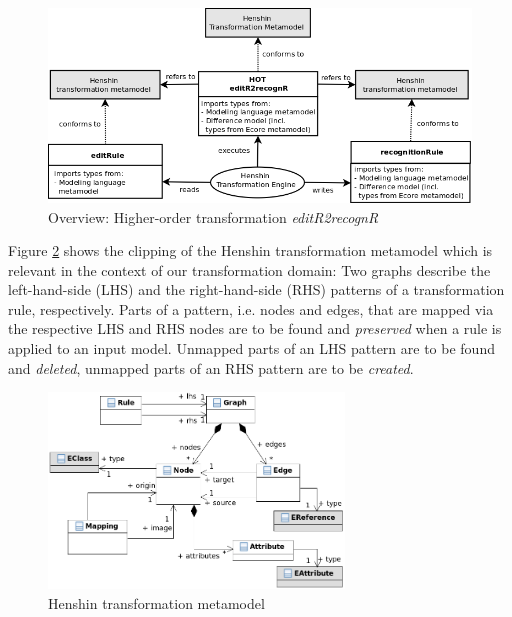 \documentclass{llncs}
\begin{document}
\begin{figure}[htb]
  \centering
  \includegraphics[width=1.0\textwidth]{pic/editR2recognitionR-overview-1.png}
  \caption{Overview: Higher-order transformation \textit{editR2recognR}}
  \label{fig:overview}
\end{figure}

Figure \ref{fig:henshin-metamodel} shows the clipping of the
Henshin transformation metamodel which is relevant in the context
of our transformation domain: 
Two graphs describe the left-hand-side (LHS)
and the right-hand-side (RHS) patterns of a transformation rule, 
respectively.
Parts of a pattern, i.e. nodes and edges, that are mapped via
the respective LHS and RHS nodes are to be found and \textit{preserved} when
a rule is applied to an input model.
Unmapped parts of an LHS pattern are to be found
and \textit{deleted}, unmapped parts of an RHS pattern 
are to be \textit{created}.

\begin{figure}[htb]
  \centering
  \includegraphics[width=0.7\textwidth]{pic/henshin-metamodel.png}
  \caption{Henshin transformation metamodel}
  \label{fig:henshin-metamodel}
\end{figure}
\end{document}
